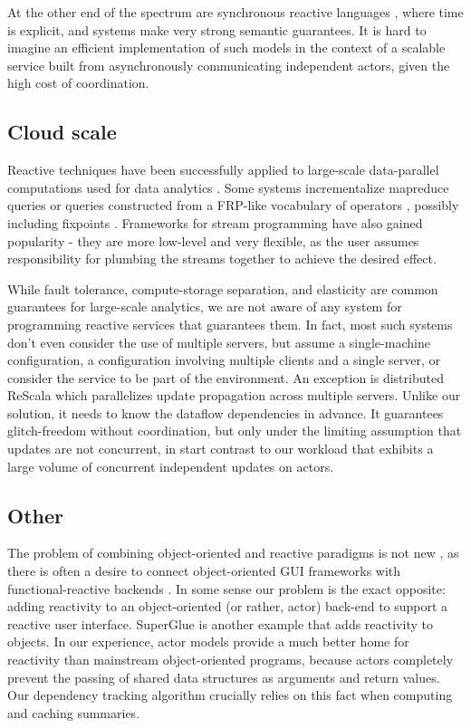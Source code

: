 At the other end of the spectrum are synchronous reactive languages \cite{lustre,signal,esterel,syncdataflow}, where time is explicit, and systems make very strong semantic guarantees. It is hard to imagine an efficient implementation of such models in the context of a scalable service built from asynchronously communicating independent actors, given the high cost of coordination.

\subsection{Cloud scale}

Reactive techniques have been successfully applied to large-scale data-parallel computations used for data analytics \cite{mapreduce,spark}. Some systems incrementalize mapreduce queries\cite{mronline,incoop} or queries constructed from a FRP-like vocabulary of operators \cite{nectar}, possibly including fixpoints \cite{frank}. Frameworks for stream programming \cite{flink} have also gained popularity - they are more low-level and very flexible, as the user assumes responsibility for plumbing the streams together to achieve the desired effect. 

While fault tolerance, compute-storage separation, and elasticity are common guarantees for large-scale analytics, we are not aware of any system for programming reactive services that guarantees them. In fact, most such systems don't even consider the use of multiple servers, but assume a single-machine configuration, a configuration involving multiple clients and a single server, or consider the service to be part of the environment. An exception is distributed ReScala\cite{drescala} which parallelizes update propagation across multiple servers. Unlike our solution, it needs to know the dataflow dependencies in advance. It guarantees glitch-freedom without coordination, but only under the limiting assumption that updates are not concurrent, in start contrast to our workload that exhibits a large volume of concurrent independent updates on actors.

\subsection{Other}

The problem of combining object-oriented and reactive paradigms is not new \cite{Salvaneschi:2013:RBO:2451436.2451442}, as there is often a desire to connect object-oriented GUI frameworks with functional-reactive backends \cite{statelines}. In some sense our problem is the exact opposite: adding reactivity to an object-oriented (or rather, actor) back-end to support a reactive user interface.  SuperGlue \cite{superglue} is another example that adds reactivity to objects. In our experience, actor models provide a much better home for reactivity than mainstream object-oriented programs, because actors completely prevent the passing of shared data structures as arguments and return values. Our dependency tracking algorithm crucially relies on this fact when computing and caching summaries.


